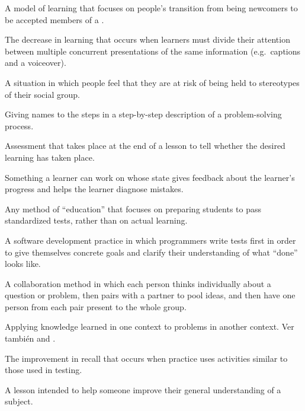 \begin{description}
 A model of learning that focuses
on people's transition from being newcomers to be accepted members of a
.

 The decrease in
learning that occurs when learners must divide their attention between multiple
concurrent presentations of the same information (e.g.\ captions and a
voiceover).

 A situation in which people feel
that they are at risk of being held to stereotypes of their social group.

 Giving names to the steps in a
step-by-step description of a problem-solving process.

 Assessment that takes
place at the end of a lesson to tell whether the desired learning has taken
place.

 Something a learner can work on
whose state gives feedback about the learner's progress and helps the learner
diagnose mistakes.

 Any method of ``education''
that focuses on preparing students to pass standardized tests, rather than on
actual learning.

 A software
development practice in which programmers write tests first in order to give
themselves concrete goals and clarify their understanding of what ``done'' looks
like.

 A collaboration method in which
each person thinks individually about a question or problem, then pairs with a
partner to pool ideas, and then have one person from each pair present to the
whole group.

 Applying knowledge learned
in one context to problems in another context.  Ver también
 and .

 The
improvement in recall that occurs when practice uses activities similar to those
used in testing.

 A lesson intended to help someone improve their
general understanding of a subject.


\end{description}
